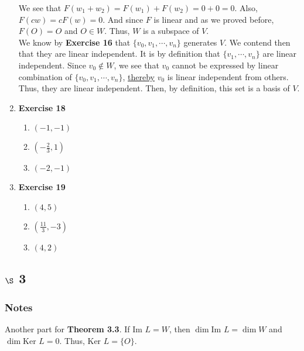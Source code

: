 \documentclass[11pt]{article}
\begin{document}
\begin{enumerate}
We see that \(F(w_1+w_2)=F(w_1)+F(w_2)=0+0=0\). Also, \(F(cw)=cF(w)=0\). And since \(F\) is linear and as we proved before, \(F(O)=O\) and \(O\in W\). Thus, \(W\) is a subspace of \(V\).\\
We know by \textbf{Exercise 16} that \(\{v_0,v_1,\cdots , v_n\}\) generates \(V\). We contend then that they are linear independent. It is by definition that \(\{v_1,\cdots , v_n\}\) are linear independent. Since \(v_0\not \in W\), we see that \(v_0\) cannot be expressed by linear combination of \(\{v_0,v_1,\cdots , v_n\}\), \hyperref[org9a76a6d]{thereby} \(v_0\) is linear independent from others. Thus, they are linear independent. Then, by definition, this set is a basis of \(V\).
\item \textbf{Exercise 18}
\label{sec:org8a13df1}
\begin{enumerate}
\item \((-1,-1)\)
\item \((-\frac{2}{3},1)\)
\item \((-2,-1)\)
\end{enumerate}
\item \textbf{Exercise 19}
\label{sec:orgff4de0f}
\begin{enumerate}
\item \((4,5)\)
\item \((\frac{11}{3},-3)\)
\item \((4,2)\)
\end{enumerate}
\end{enumerate}
\subsection{\(\S\) 3}
\label{sec:orga8e07f7}
\subsubsection{Notes}
\label{sec:orgfd538c0}
Another part for \textbf{Theorem 3.3}. If \(\text{Im } L=W\), then \(\dim \text{Im } L=\dim W\) and \(\dim \text{Ker }L=0\). Thus, \(\text{Ker } L=\{O\}\).
\end{document}
